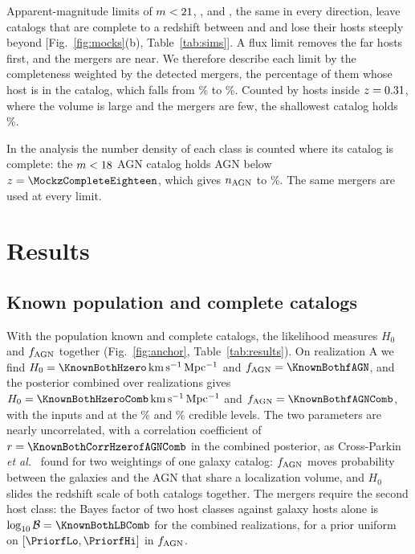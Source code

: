 \documentclass[aps,prd,reprint,twocolumn,superscriptaddress,nofootinbib,floatfix,nolongbibliography]{revtex4-2}
\newcommand{\kms}{{\rm km\,s^{-1}\,Mpc^{-1}}}
\newcommand{\fagn}{f_{\rm AGN}}
\newcommand{\nagn}{n_{\rm AGN}}
\newcommand{\lB}{\log_{10}\mathcal{B}}
\begin{document}
Apparent-magnitude limits of $m<21$, \MockMlimTwenty,
\MockMlimNineteen{} and \MockMlimEighteen, the same in every direction, leave
catalogs that are complete to a redshift between \MockzCompleteTwentyOne{}
and \MockzCompleteEighteen{} and lose their hosts steeply beyond
[Fig.~\ref{fig:mocks}(b), Table~\ref{tab:sims}]. A flux limit removes the
far hosts first, and the mergers are near. We therefore describe each limit
by the completeness weighted by the detected mergers, the percentage of them
whose host is in the catalog, which falls from \MockEventCompTwentyOne\% to
\MockEventCompEighteen\%. Counted by hosts inside $z=0.31$, where
the volume is large and the mergers are few, the shallowest catalog holds
\MockCompEighteen\%.

In the analysis the number density of each class is counted where its
catalog is complete: the
$m<18$ AGN catalog holds \MockNAGNCompleteEighteen{} AGN below
$z=\MockzCompleteEighteen$, which gives $\nagn$ to \MocknAGNPrecEighteen\%.
The same mergers are used at every limit.

\section{Results}
\label{sec:results}

\subsection{Known population and complete catalogs}
\label{sec:anchor}

With the population known and complete catalogs, the likelihood measures
$H_0$ and $\fagn$ together (Fig.~\ref{fig:anchor},
Table~\ref{tab:results}). On realization A we find
$H_0=\KnownBothHzero\,\kms$ and $\fagn=\KnownBothfAGN$, and the posterior
combined over \NrealKnown{} realizations gives
$H_0=\KnownBothHzeroComb\,\kms$ and $\fagn=\KnownBothfAGNComb$, with the
inputs \MockHzero{} and \MockfAGN{} at the \KnownBothHzeroCL\% and
\KnownBothfAGNCL\% credible levels. The two parameters are nearly
uncorrelated, with a correlation coefficient of
$r=\KnownBothCorrHzerofAGNComb$ in the combined posterior, as
Cross-Parkin \textit{et
al.}~\cite{Cross-Parkin:2026pua} found for two weightings of one galaxy
catalog: $\fagn$ moves probability between the galaxies and the AGN that
share a localization volume, and $H_0$ slides the redshift scale of both
catalogs together.
The mergers require the second host class:
the Bayes factor of two host classes against galaxy hosts alone is
$\lB=\KnownBothLBComb$ for the combined realizations, for a prior uniform on
$[\PriorfLo,\PriorfHi]$ in $\fagn$.
\end{document}
